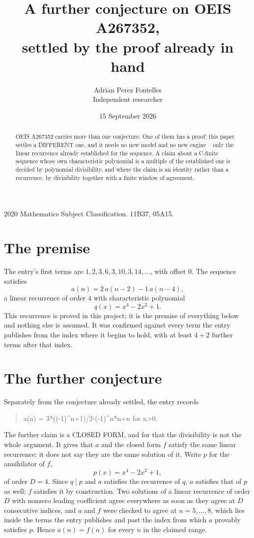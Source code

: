 \documentclass[11pt,a4paper]{article}
\title{A further conjecture on OEIS A267352,\\ \large settled by the proof already in hand}
\author{Adrian Perez Fontelles\\ \small Independent researcher}
\date{15 September 2026}
\theoremstyle{plain}
\theoremstyle{definition}
\begin{document}
\maketitle

\begin{abstract}
OEIS A267352 carries more than one conjecture. One of them has a proof; this paper settles a
DIFFERENT one, and it needs no new model and no new engine -- only the linear recurrence already
established for the sequence. A claim about a C-finite sequence whose own characteristic
polynomial is a multiple of the established one is decided by polynomial divisibility, and where
the claim is an identity rather than a recurrence, by divisibility together with a finite window
of agreement.
\end{abstract}

\noindent\small 2020 Mathematics Subject Classification. 11B37, 05A15.\normalsize

\section{The premise}

The entry's first terms are $1, 2, 3, 6, 3, 10, 3, 14,\dots$, with offset $0$. The sequence satisfies
\[
  a(n)=2\,a(n-2) - 1\,a(n-4) ,
\]
a linear recurrence of order $4$ with characteristic polynomial
\[
  q(x)=x^{4} - 2 x^{2} + 1 .
\]
This recurrence is proved in this project; it is the premise of everything below and nothing else is assumed.
It was confirmed against every term the entry publishes from the index where it begins to hold,
with at least $4+2$ further terms after that index.

\section{The further conjecture}

Separately from the conjecture already settled, the entry records

\begin{quote}\raggedright a(n) = 3*((-1)\^{}n+1)/2-(-1)\^{}n*n+n for n>0.\end{quote}

The further claim is a CLOSED FORM, and for that the divisibility is not the whole argument. It
gives that $a$ and the closed form $f$ satisfy the same linear recurrence; it does not say they
are the same solution of it. Write $p$ for the annihilator of $f$,
\[
  p(x)=x^{4} - 2 x^{2} + 1 ,
\]
of order $D=4$. Since $q\mid p$ and $a$ satisfies the recurrence of $q$, $a$ satisfies that of
$p$ as well; $f$ satisfies it by construction. Two solutions of a linear recurrence of order $D$
with nonzero leading coefficient agree everywhere as soon as they agree at $D$ consecutive
indices, and $a$ and $f$ were checked to agree at $n=5,\dots,8$,
which lies inside the terms the entry publishes and past the index from which $a$ provably
satisfies $p$. Hence $a(n)=f(n)$ for every $n$ in the claimed range.
\end{document}
